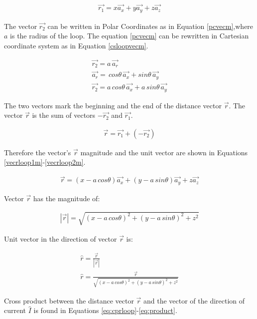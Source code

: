 \documentclass{ximera}
\begin{document}
\begin{eqnarray}
\vec{r_1}=x \vec{a_x} + y \vec{a_y} +z\vec{a_z} \label{eq1loopm}
\end{eqnarray}

The vector $\vec{r_2}$ can be written in Polar Coordinates as in Equation \ref{pcvecm},where $a$ is the radius of the loop. The equation \ref{pcvecm} can be rewritten in Cartesian coordinate system as in Equation \ref{csloopvecm}.

\begin{eqnarray}
\vec{r_2}=a \, \vec{a_r} \label{pcvecm} \\
\vec{a_r}= \,cos{\theta} \, \vec{a_x}+ sin{\theta} \, \vec{a_y} \\
\vec{r_2}=a \, cos{\theta}\,  \vec{a_x}+ a \, sin{\theta} \, \vec{a_y} \label{csloopvecm}
\end{eqnarray}

The two vectors mark the beginning and the end of the distance vector $\vec{r}$. The vector  $\vec{r}$ is the sum of vectors $-\vec{r_2}$ and $\vec{r_1}$. 



\begin{eqnarray}
\vec{r}=\vec{r_1} + (-\vec{r_2})
\end{eqnarray}


Therefore the vector's $\vec{r}$  magnitude and the unit vector are shown in Equations \ref{vecrloop1m}-\ref{vecrloop2m}.


\begin{eqnarray}
\vec{r}= (x -  a \,cos{\theta}) \vec{a_x} +(y - a \,sin{\theta}) \vec{a_y} +z \vec{a_z}
\end{eqnarray}

Vector $\vec{r}$ has the magnitude of:


\begin{eqnarray}
|\vec{r}|= \sqrt{(x - a \,cos{\theta})^2 +(y - a \,sin{\theta})^2 +z ^2}\label{vecrloop1m}
\end{eqnarray}

Unit vector in the direction of vector $\vec{r}$ is:


\begin{eqnarray}
\hat{r}= \frac{\vec{r}}{|\vec{r}|} \\
\hat{r}=\frac{\vec{r}}{\sqrt{(x - a \, cos{\theta})^2 +(y - a  \, sin{\theta})^2 +z^2}}\label{vecrloop2m}
\end{eqnarray}

Cross product between the distance vector $\vec{r}$ and the vector of the direction of current $\hat{I}$ is found in Equations \ref{eq:cprloop}-\ref{eq:product}.
\end{document}
